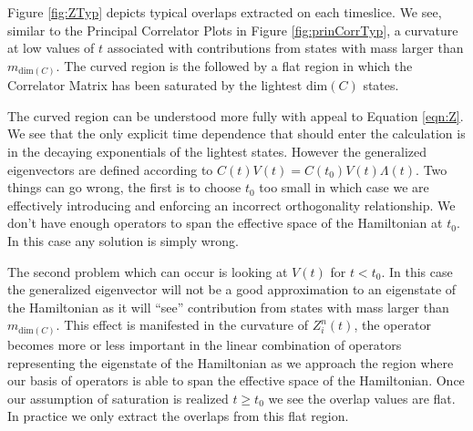 Figure \ref{fig:ZTyp} depicts typical overlaps extracted on each timeslice.  We see, similar to the Principal Correlator Plots in Figure \ref{fig:prinCorrTyp}, a curvature at low values of $t$ associated with contributions from states with mass larger than $m_{\mathrm{dim}(C)}$. The curved region is the followed by a flat region in which the Correlator Matrix has been saturated by the lightest $\mathrm{dim}(C)$ states. 
\par
The curved region can be understood more fully with appeal to Equation \ref{eqn:Z}.  We see that the only explicit time dependence that should enter the calculation is in the decaying exponentials of the lightest states. However the generalized eigenvectors are defined according to $C(t)V(t) = C(t_0)V(t)\Lambda(t)$. Two things can go wrong, the first is to choose $t_0$ too small in which case we are  effectively introducing and enforcing an incorrect orthogonality relationship. We don't have enough operators to span the effective space of the Hamiltonian at $t_0$. In this case any solution is simply wrong. 
\par
The second problem which can occur is looking at $V(t)$ for $t < t_0$.  In this case the generalized eigenvector will not be a good approximation to an eigenstate of the Hamiltonian as it will ``see'' contribution from states with mass larger than $m_{\mathrm{dim}(C)}$. This effect is manifested in the curvature of $Z_i^n(t)$, the operator becomes more or less important in the linear combination of operators representing the eigenstate of the Hamiltonian as we approach the region where our basis of operators is able to span the effective space of the Hamiltonian. Once our assumption of saturation is realized $t \geq t_0$ we see the overlap values are flat. In practice we only extract the overlaps from this flat region.

